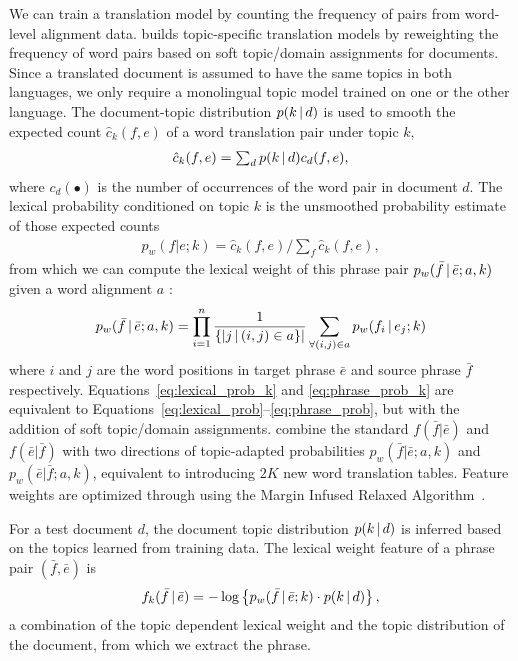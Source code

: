 We can train a translation model by counting the frequency of pairs from word-level alignment data.
\citet{Eidelman-12} builds topic-specific translation models by reweighting the frequency of word pairs based on soft topic/domain assignments for documents.
Since a translated document is assumed to have the same topics in both languages, we only require a monolingual topic model trained on one or the other language.
The document-topic distribution $p(k \, | \, d)$ is used
to smooth the expected count $\hat{c}_{k}(f,e)$ of a word translation
pair under topic $k$,
\begin{align}
\textstyle \hat{c}_{k}(f,e) = \sum_{d}{p(k \, | \, d)c_d(f,e)},
\end{align}
where $c_d(\bullet)$ is the number of occurrences of the word pair in
document $d$.  The lexical probability conditioned on topic $k$ is the
unsmoothed probability estimate of those expected counts
\begin{align}
\label{eq:lexical_prob_k}
\textstyle p_w(f|e;k) = \hat{c}_{k}(f,e) / \sum_f{\hat{c}_{k}(f,e)},
\end{align}
from which we can compute the lexical weight of this phrase pair
$p_w(\bar{f} \, | \, \bar{e};a, k)$ given a word alignment $a$ \citep{koehn-03}:
\begin{align}
\label{eq:phrase_prob_k}
p_w(\bar{f} \, | \, \bar{e};a, k) = \prod^{n}_{i=1} \frac{1}{\{|j \, | \, (i, j) \in a\}|} \sum_{\forall (i,j) \in a} p_w(f_i \, | \, e_j; k)
\end{align}
where $i$ and $j$ are the word positions in target phrase $\bar{e}$
and source phrase $\bar{f}$ respectively. 
Equations~\ref{eq:lexical_prob_k} and \ref{eq:phrase_prob_k} are equivalent to Equations~\ref{eq:lexical_prob}--\ref{eq:phrase_prob}, but with the addition of soft topic/domain assignments.
\citet{Eidelman-12} combine the standard $f(\bar{f}|\bar{e})$ and
$f(\bar{e}|\bar{f})$ with two directions of
topic-adapted probabilities 
$p_w(\bar{f} | \bar{e};a, k)$ and $p_w(\bar{e} | \bar{f};a, k)$, equivalent to introducing $2K$ new word translation tables. 
Feature weights are optimized through
using the Margin Infused Relaxed
  Algorithm~\cite[\textsc{mira}]{Crammer-06}.

For a test document $d$, the document topic distribution $p(k \, | \, d)$ is
inferred based on the topics learned from training data. The lexical
weight feature of a phrase pair $(\bar{f}, \bar{e})$ is
\begin{align}
\textstyle f_{k}(\bar{f} \, | \, \bar{e})=-\log\left\{{p_{w}(\bar{f} \, | \,
  \bar{e};k)\cdot p(k \, | \, d)}\right\},
\end{align}
a combination of the topic dependent lexical weight and the topic
distribution of the document, from which we extract the phrase.

